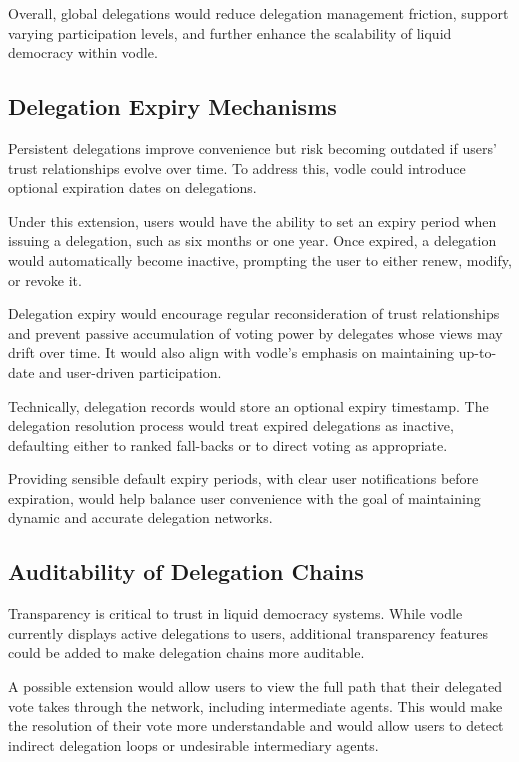 Overall, global delegations would reduce delegation management friction, support varying participation levels, and further enhance the scalability of liquid democracy within vodle.

\subsection{Delegation Expiry Mechanisms}

Persistent delegations improve convenience but risk becoming outdated if users' trust relationships evolve over time. To address this, vodle could introduce optional expiration dates on delegations.

Under this extension, users would have the ability to set an expiry period when issuing a delegation, such as six months or one year. Once expired, a delegation would automatically become inactive, prompting the user to either renew, modify, or revoke it.

Delegation expiry would encourage regular reconsideration of trust relationships and prevent passive accumulation of voting power by delegates whose views may drift over time. It would also align with vodle's emphasis on maintaining up-to-date and user-driven participation.

Technically, delegation records would store an optional expiry timestamp. The delegation resolution process would treat expired delegations as inactive, defaulting either to ranked fall-backs or to direct voting as appropriate.

Providing sensible default expiry periods, with clear user notifications before expiration, would help balance user convenience with the goal of maintaining dynamic and accurate delegation networks.

\subsection{Auditability of Delegation Chains}

Transparency is critical to trust in liquid democracy systems. While vodle currently displays active delegations to users, additional transparency features could be added to make delegation chains more auditable.

A possible extension would allow users to view the full path that their delegated vote takes through the network, including intermediate agents. This would make the resolution of their vote more understandable and would allow users to detect indirect delegation loops or undesirable intermediary agents.

